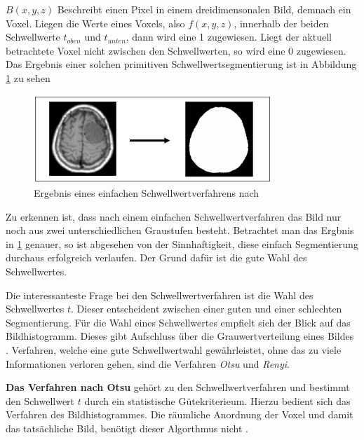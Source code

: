 $B(x, y, z)$ Beschreibt einen Pixel in einem dreidimensonalen Bild, demnach ein Voxel.
Liegen die Werte eines Voxels, also $f(x, y, z)$, innerhalb der beiden
Schwellwerte $t_{oben}$ und $t_{unten}$, dann wird eine 1 zugewiesen. Liegt der
aktuell betrachtete Voxel nicht zwischen den Schwellwerten, so wird eine 0 zugewiesen.
Das Ergebnis einer solchen primitiven Schwellwertsegmentierung ist in Abbildung
\ref{fig:binäres_schwellwertverfahren} zu sehen

\begin{figure}[h]
	\centering
	\includegraphics[width=0.8\textwidth]{img/beispiel_schwellwertverfahren.jpg}
	\caption{Ergebnis eines einfachen Schwellwertverfahrens nach \citet[Seite 96]{handels2000}}
	\label{fig:binäres_schwellwertverfahren}
\end{figure}

Zu erkennen ist, dass nach einem einfachen Schwellwertverfahren das Bild nur noch
aus zwei unterschiedlichen Graustufen besteht. Betrachtet man das Ergbnis in
\ref{fig:binäres_schwellwertverfahren} genauer, so ist abgesehen von der Sinnhaftigkeit,
diese einfach Segmentierung durchaus erfolgreich verlaufen. Der Grund dafür ist die
gute Wahl des Schwellwertes.

Die interessanteste Frage bei den Schwellwertverfahren ist die Wahl des Schwellwertes
$t$. Dieser entscheident zwischen einer guten und einer schlechten Segmentierung.
Für die Wahl eines Schwellwertes empfielt sich der Blick auf das Bildhistogramm.
Dieses gibt Aufschluss über die Grauwertverteilung eines Bildes \citep[vgl.][Seite361]{lehmann2013bildverarbeitung}.
Verfahren, welche eine gute Schwellwertwahl gewährleistet, ohne das zu viele Informationen
verloren gehen, sind die Verfahren \textit{Otsu} und \textit{Renyi}.

\pagebreak

\textbf{Das Verfahren nach Otsu} gehört zu den Schwellwertverfahren und bestimmt
den Schwellwert $t$ durch ein statistische Gütekriterieum. Hierzu bedient sich das
Verfahren des Bildhistogrammes. Die räumliche Anordnung der Voxel und damit das
tatsächliche Bild, benötigt dieser Algorthmus nicht \citep[vgl.][Seite 264]{lehmann2013bildverarbeitung}.

